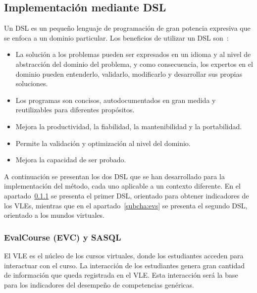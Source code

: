 	\subsection{Implementación mediante DSL}

		Un DSL es un pequeño lenguaje de programación de gran potencia expresiva que se enfoca a un dominio particular. Los beneficios de utilizar un DSL son~\cite{vanDeursen:2000}:
		\begin{itemize}
			\item La solución a los problemas pueden ser expresados en un idioma y al nivel de abstracción del dominio del problema, y como consecuencia, los expertos en el dominio pueden entenderlo, validarlo, modificarlo y desarrollar sus propias soluciones.
			\item Los programas son concisos, autodocumentados en gran medida y reutilizables para diferentes propósitos.
			\item Mejora la productividad, la fiabilidad, la mantenibilidad y la portabilidad.
			\item Permite la validación y optimización al nivel del dominio.
			\item Mejora la capacidad de ser probado.
		\end{itemize} 

		A continuación se presentan los dos DSL que se han desarrollado para la implementación del método, cada uno aplicable a un contexto diferente. En el apartado~\ref{subcha:evc} se presenta el primer DSL, orientado para obtener indicadores de los VLEs, mientras que en el apartado~\ref{subcha:evs} se presenta el segundo DSL, orientado a los mundos virtuales. 

		\subsubsection{EvalCourse (EVC) y SASQL} \label{subcha:evc}



	El VLE es el núcleo de los cursos virtuales, donde los estudiantes acceden para interactuar con el curso. La interacción de los estudiantes genera gran cantidad de información que queda registrada en el VLE. Esta interacción será la base para los indicadores del desempeño de competencias genéricas.

